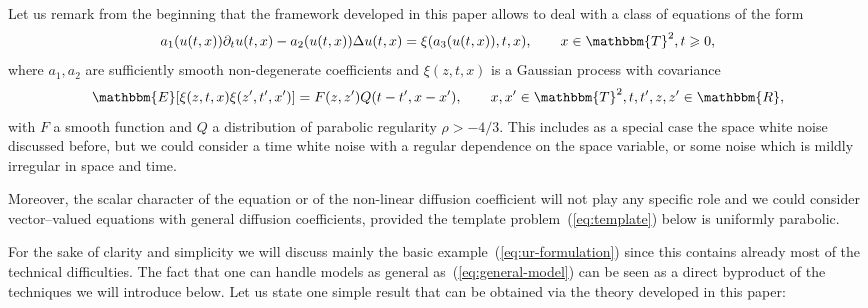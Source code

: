 \documentclass{amsart}
\theoremstyle{remark}
\theoremstyle{definition}
\begin{document}
Let us remark from the beginning that the framework developed in this paper
allows to deal with a class of equations of the form
\begin{equation}
  a_1 (u (t, x)) \partial_t u (t, x) - a_2 (u (t, x)) \Delta u (t, x) = \xi
  (a_3 (u (t, x)), t, x), \qquad x \in \mathbbm{T}^2, t \geqslant 0,
  \label{eq:general-model}
\end{equation}
where $a_1, a_2$ are sufficiently smooth non-degenerate coefficients and $\xi
(z, t, x)$ is a Gaussian process with covariance
\[ \mathbbm{E} [\xi (z, t, x) \xi (z', t', x')] = F (z, z') Q (t - t', x -
   x'), \qquad x, x' \in \mathbbm{T}^2, t, t', z, z' \in \mathbbm{R}, \]
with $F$ a smooth function and $Q$ a distribution of parabolic regularity
$\rho > - 4 / 3$. This includes as a special case the space white noise
discussed before, but we could consider a time white noise with a regular
dependence on the space variable, or some noise which is mildly irregular in
space and time.

Moreover, the scalar character of the equation or of the non-linear diffusion
coefficient will not play any specific role and we could consider
vector--valued equations with general diffusion coefficients, provided the
template problem~(\ref{eq:template}) below is uniformly parabolic.

For the sake of clarity and simplicity we will discuss mainly the basic
example~(\ref{eq:ur-formulation}) since this contains already most of the
technical difficulties. The fact that one can handle models as general
as~(\ref{eq:general-model}) can be seen as a direct byproduct of the
techniques we will introduce below. Let us state one simple result that can be
obtained via the theory developed in this paper:
\end{document}

